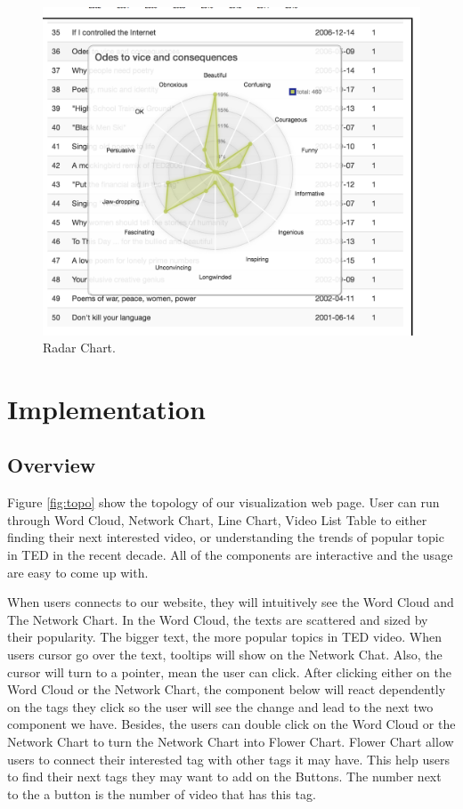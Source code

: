 \documentclass{report}
\numberwithin{figure}{section}
\begin{document}
\begin{figure}
\begin{center}
\includegraphics[scale=0.5]{radar}
\caption{Radar Chart.}
\label{fig:radar}
\end{center}
\end{figure} 


\chapter{Implementation}
\section{Overview}
\quad Figure \ref{fig:topo} show the topology of our visualization web page. User can run through Word Cloud, Network Chart, Line Chart, Video List Table to either finding their next interested video, or understanding the trends of popular topic in TED in the recent decade. All of the components are interactive and the usage are easy to come up with.

When users connects to our website, they will intuitively see the Word Cloud and The Network Chart. In the Word Cloud, the texts are scattered and sized by their popularity. The bigger text, the more popular topics in TED video. When users cursor go over the text, tooltips will show on the Network Chat. Also, the cursor will turn to a pointer, mean the user can click. After clicking either on the Word Cloud or the Network Chart, the component below will react dependently on the tags they click so the user will see the change and lead to the next two component we have. Besides, the users can double click on the Word Cloud or the Network Chart to turn the Network Chart into Flower Chart. Flower Chart allow users to connect their interested tag with other tags it may have. This help users to find their next tags they may want to add on the Buttons. The number next to the a button is the number of video that has this tag.
\end{document}
